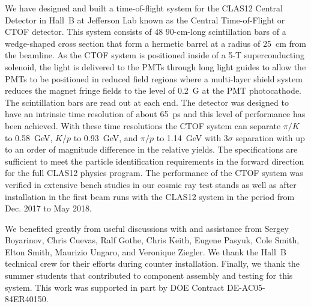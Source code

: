 \documentclass{elsart}
\begin{document}
We have designed and built a time-of-flight system for the CLAS12 Central Detector in Hall~B 
at Jefferson Lab known as the Central Time-of-Flight or CTOF detector. This system consists 
of 48 90-cm-long scintillation bars of a wedge-shaped cross section that form a hermetic barrel
at a radius of 25~cm from the beamline. As the CTOF system is positioned inside of a 5-T
superconducting solenoid, the light is delivered to the PMTs through long light guides to allow the
PMTs to be positioned in reduced field regions where a multi-layer shield system reduces the
magnet fringe fields to the level of 0.2~G at the PMT photocathode. The scintillation bars are read
out at each end. The detector was designed to have an intrinsic time resolution of about 65~ps and
this level of performance has been achieved. With these time resolutions the CTOF system can
separate $\pi/K$ to 0.58~GeV, $K/p$ to 0.93~GeV, and $\pi/p$ to 1.14~GeV with 3$\sigma$
separation with up to an order of magnitude difference in the relative yields.  The specifications are
sufficient to meet the particle identification requirements in the forward direction for the full CLAS12
physics program. The performance of the CTOF system was verified in extensive bench studies in our
cosmic ray test stands as well as after installation in the first beam runs with the CLAS12 system in
the period from Dec. 2017 to May 2018. 

\ack

We benefited greatly from useful discussions with and assistance from Sergey Boyarinov, Chris
Cuevas, Ralf Gothe, Chris Keith, Eugene Pasyuk, Cole Smith, Elton Smith, Maurizio Ungaro, and
Veronique Ziegler. We thank the Hall~B technical crew for their efforts during counter installation.
Finally, we thank the summer students that contributed to component assembly and testing for this
system. This work was supported in part by DOE Contract DE-AC05-84ER40150.
\end{document}
